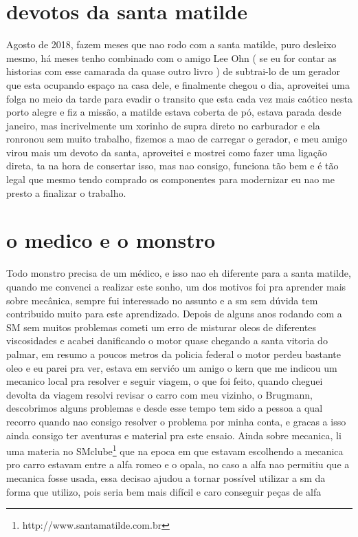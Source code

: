 \documentclass[a4paper]{report}
\begin{document}
\section*{devotos da santa matilde}

Agosto de 2018, fazem meses que nao rodo com a santa matilde, puro desleixo mesmo, h\'a meses tenho combinado com o amigo Lee Ohn ( se eu for contar as historias com esse camarada da quase outro livro ) de subtrai-lo de um gerador que esta ocupando espa\c{c}o na casa dele, e finalmente chegou o dia, aproveitei uma folga no meio da tarde para evadir o transito que esta cada vez mais ca\'otico nesta porto alegre e fiz a miss\~ao, a matilde estava coberta de p\'o, estava parada desde janeiro, mas incrivelmente um xorinho de supra direto no carburador e ela ronronou sem muito trabalho, fizemos a mao de carregar o gerador, e meu amigo virou mais um devoto da santa, aproveitei e mostrei como fazer uma liga\c{c}\~ao direta, ta na hora de consertar isso, mas nao consigo, funciona t\~ao bem e \'e t\~ao legal que mesmo tendo comprado os componentes para modernizar eu nao me presto a finalizar o trabalho. 

\section*{o medico e o monstro}

Todo monstro precisa de um m\'edico, e isso nao eh diferente para a santa matilde, quando me convenci a realizar este sonho, um dos motivos foi pra
aprender mais sobre mec\^anica, sempre fui interessado no assunto e a sm sem d\'uvida tem contribuido muito para este aprendizado.
Depois de alguns anos rodando com a SM sem muitos problemas cometi um erro de misturar oleos de diferentes viscosidades e acabei danificando o motor quase chegando a santa vitoria do palmar, em resumo a poucos metros da policia federal o motor perdeu bastante oleo e eu parei pra ver, estava em servi\'co um amigo o kern que me indicou um mecanico local pra resolver e seguir viagem, o que foi feito, quando cheguei devolta da viagem resolvi revisar o carro com meu vizinho, o Brugmann, descobrimos alguns problemas e desde esse tempo tem sido a pessoa a qual recorro quando nao consigo resolver o problema por minha conta, e gracas a isso ainda consigo ter aventuras e material pra este ensaio.
Ainda sobre mecanica, li uma materia no SMclube\footnote{http://www.santamatilde.com.br} que na epoca em que estavam escolhendo a mecanica pro carro estavam entre a alfa romeo e o opala, no caso a alfa nao permitiu que a mecanica fosse usada,  essa decisao ajudou a tornar poss\'ivel  utilizar a sm da forma que utilizo, pois seria bem mais dif\'icil e caro conseguir pe\c{c}as de alfa
\end{document}

